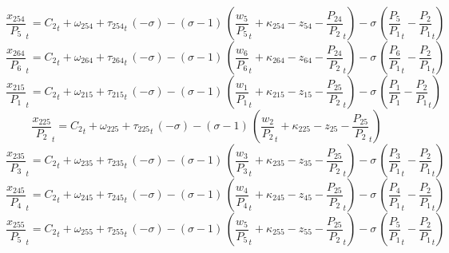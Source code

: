 \begin{dmath}
{{\frac{x_{254}}{P_{5}}}}_{t}={{C_{2}}}_{t}+{{\omega_{254}}}+{{\tau_{254}}}_{t}\, \left(-{{\sigma}}\right)-\left({{\sigma}}-1\right)\, \left({{\frac{w_{5}}{P_{5}}}}_{t}+{{\kappa_{254}}}-{{z_{54}}}-{{\frac{P_{24}}{P_{2}}}}_{t}\right)-{{\sigma}}\, \left({{\frac{P_{5}}{P_{1}}}}_{t}-{{\frac{P_{2}}{P_{1}}}}_{t}\right)
\end{dmath}
\begin{dmath}
{{\frac{x_{264}}{P_{6}}}}_{t}={{C_{2}}}_{t}+{{\omega_{264}}}+{{\tau_{264}}}_{t}\, \left(-{{\sigma}}\right)-\left({{\sigma}}-1\right)\, \left({{\frac{w_{6}}{P_{6}}}}_{t}+{{\kappa_{264}}}-{{z_{64}}}-{{\frac{P_{24}}{P_{2}}}}_{t}\right)-{{\sigma}}\, \left({{\frac{P_{6}}{P_{1}}}}_{t}-{{\frac{P_{2}}{P_{1}}}}_{t}\right)
\end{dmath}
\begin{dmath}
{{\frac{x_{215}}{P_{1}}}}_{t}={{C_{2}}}_{t}+{{\omega_{215}}}+{{\tau_{215}}}_{t}\, \left(-{{\sigma}}\right)-\left({{\sigma}}-1\right)\, \left({{\frac{w_{1}}{P_{1}}}}_{t}+{{\kappa_{215}}}-{{z_{15}}}-{{\frac{P_{25}}{P_{2}}}}_{t}\right)-{{\sigma}}\, \left({{\frac{P_{1}}{P_{1}}}}-{{\frac{P_{2}}{P_{1}}}}_{t}\right)
\end{dmath}
\begin{dmath}
{{\frac{x_{225}}{P_{2}}}}_{t}={{C_{2}}}_{t}+{{\omega_{225}}}+{{\tau_{225}}}_{t}\, \left(-{{\sigma}}\right)-\left({{\sigma}}-1\right)\, \left({{\frac{w_{2}}{P_{2}}}}_{t}+{{\kappa_{225}}}-{{z_{25}}}-{{\frac{P_{25}}{P_{2}}}}_{t}\right)
\end{dmath}
\begin{dmath}
{{\frac{x_{235}}{P_{3}}}}_{t}={{C_{2}}}_{t}+{{\omega_{235}}}+{{\tau_{235}}}_{t}\, \left(-{{\sigma}}\right)-\left({{\sigma}}-1\right)\, \left({{\frac{w_{3}}{P_{3}}}}_{t}+{{\kappa_{235}}}-{{z_{35}}}-{{\frac{P_{25}}{P_{2}}}}_{t}\right)-{{\sigma}}\, \left({{\frac{P_{3}}{P_{1}}}}_{t}-{{\frac{P_{2}}{P_{1}}}}_{t}\right)
\end{dmath}
\begin{dmath}
{{\frac{x_{245}}{P_{4}}}}_{t}={{C_{2}}}_{t}+{{\omega_{245}}}+{{\tau_{245}}}_{t}\, \left(-{{\sigma}}\right)-\left({{\sigma}}-1\right)\, \left({{\frac{w_{4}}{P_{4}}}}_{t}+{{\kappa_{245}}}-{{z_{45}}}-{{\frac{P_{25}}{P_{2}}}}_{t}\right)-{{\sigma}}\, \left({{\frac{P_{4}}{P_{1}}}}_{t}-{{\frac{P_{2}}{P_{1}}}}_{t}\right)
\end{dmath}
\begin{dmath}
{{\frac{x_{255}}{P_{5}}}}_{t}={{C_{2}}}_{t}+{{\omega_{255}}}+{{\tau_{255}}}_{t}\, \left(-{{\sigma}}\right)-\left({{\sigma}}-1\right)\, \left({{\frac{w_{5}}{P_{5}}}}_{t}+{{\kappa_{255}}}-{{z_{55}}}-{{\frac{P_{25}}{P_{2}}}}_{t}\right)-{{\sigma}}\, \left({{\frac{P_{5}}{P_{1}}}}_{t}-{{\frac{P_{2}}{P_{1}}}}_{t}\right)
\end{dmath}
